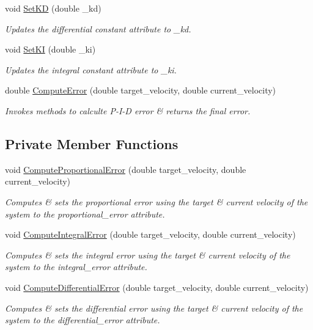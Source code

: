 \begin{DoxyCompactItemize}
void \hyperlink{classPID_a36036f3b87f536408dad924bae81394b}{Set\+KD} (double \+\_\+kd)
\begin{DoxyCompactList}\small\item\em Updates the differential constant attribute to \+\_\+kd. \end{DoxyCompactList}\item 
void \hyperlink{classPID_af533c956b594242689fb74d758106937}{Set\+KI} (double \+\_\+ki)
\begin{DoxyCompactList}\small\item\em Updates the integral constant attribute to \+\_\+ki. \end{DoxyCompactList}\item 
double \hyperlink{classPID_ad5113ca1c4111c36945646a2f23f6a3a}{Compute\+Error} (double target\+\_\+velocity, double current\+\_\+velocity)
\begin{DoxyCompactList}\small\item\em Invokes methods to calculte P-\/\+I-\/D error \& returns the final error. \end{DoxyCompactList}\end{DoxyCompactItemize}
\subsection*{Private Member Functions}
\begin{DoxyCompactItemize}
\item 
void \hyperlink{classPID_a59aa8f314e7dad1db04cad16af197935}{Compute\+Proportional\+Error} (double target\+\_\+velocity, double current\+\_\+velocity)
\begin{DoxyCompactList}\small\item\em Computes \& sets the proportional error using the target \& current velocity of the system to the proportional\+\_\+error attribute. \end{DoxyCompactList}\item 
void \hyperlink{classPID_a4af936207ba4f04163709e4bfd909468}{Compute\+Integral\+Error} (double target\+\_\+velocity, double current\+\_\+velocity)
\begin{DoxyCompactList}\small\item\em Computes \& sets the integral error using the target \& current velocity of the system to the integral\+\_\+error attribute. \end{DoxyCompactList}\item 
void \hyperlink{classPID_a6ad839da6f331ec367d1c379960d2aa5}{Compute\+Differential\+Error} (double target\+\_\+velocity, double current\+\_\+velocity)
\begin{DoxyCompactList}\small\item\em Computes \& sets the differential error using the target \& current velocity of the system to the differential\+\_\+error attribute. \end{DoxyCompactList}\end{DoxyCompactItemize}
